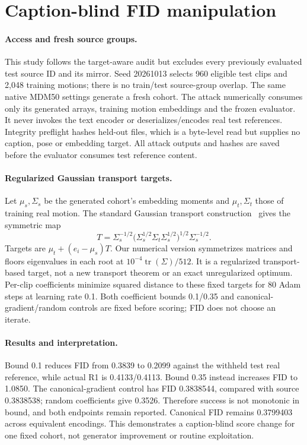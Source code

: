 \documentclass[10pt,twocolumn,letterpaper]{article}
\begin{document}
\section{Caption-blind FID manipulation}
\paragraph{Access and fresh source groups.}
This study follows the target-aware audit but excludes every previously evaluated test source ID and its mirror. Seed 20261013 selects 960 eligible test clips and 2,048 training motions; there is no train/test source-group overlap. The same native MDM50 settings generate a fresh cohort. The attack numerically consumes only its generated arrays, training motion embeddings and the frozen evaluator. It never invokes the text encoder or deserializes/encodes real test references. Integrity preflight hashes held-out files, which is a byte-level read but supplies no caption, pose or embedding target. All attack outputs and hashes are saved before the evaluator consumes test reference content.

\paragraph{Regularized Gaussian transport targets.}
Let $\mu_s,\Sigma_s$ be the generated cohort's embedding moments and $\mu_t,\Sigma_t$ those of training real motion. The standard Gaussian transport construction~\cite{bhatia2017} gives the symmetric map
\begin{equation}
T=\Sigma_s^{-1/2}\bigl(\Sigma_s^{1/2}\Sigma_t\Sigma_s^{1/2}\bigr)^{1/2}\Sigma_s^{-1/2}.
\end{equation}
Targets are $\mu_t+(e_i-\mu_s)T$. Our numerical version symmetrizes matrices and floors eigenvalues in each root at $10^{-4}\operatorname{tr}(\Sigma)/512$. It is a regularized transport-based target, not a new transport theorem or an exact unregularized optimum. Per-clip coefficients minimize squared distance to these fixed targets for 80 Adam steps at learning rate 0.1. Both coefficient bounds 0.1/0.35 and canonical-gradient/random controls are fixed before scoring; FID does not choose an iterate.



\paragraph{Results and interpretation.}
Bound 0.1 reduces FID from 0.3839 to 0.2099 against the withheld test real reference, while actual R1 is 0.4133/0.4113. Bound 0.35 instead increases FID to 1.0850. The canonical-gradient control has FID 0.3838544, compared with source 0.3838538; random coefficients give 0.3526. Therefore success is not monotonic in bound, and both endpoints remain reported. Canonical FID remains 0.3799403 across equivalent encodings. This demonstrates a caption-blind score change for one fixed cohort, not generator improvement or routine exploitation.
\end{document}
